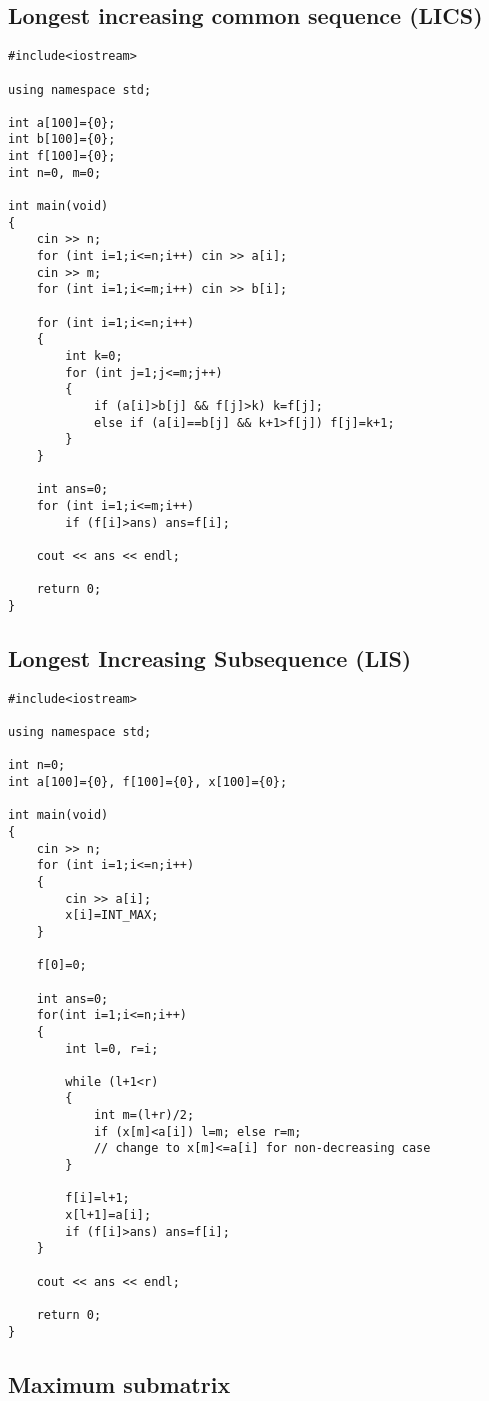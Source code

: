 \documentclass[a4paper]{article}
\begin{document}
\subsection{Longest increasing common sequence (LICS)}

\begin{verbatim}
#include<iostream>

using namespace std;

int a[100]={0};
int b[100]={0};
int f[100]={0};
int n=0, m=0;

int main(void)
{
	cin >> n;
	for (int i=1;i<=n;i++) cin >> a[i];
	cin >> m;
	for (int i=1;i<=m;i++) cin >> b[i];

	for (int i=1;i<=n;i++)
	{
		int k=0;
		for (int j=1;j<=m;j++)
		{
			if (a[i]>b[j] && f[j]>k) k=f[j];
			else if (a[i]==b[j] && k+1>f[j]) f[j]=k+1;
		}
	}

	int ans=0;
	for (int i=1;i<=m;i++)
		if (f[i]>ans) ans=f[i];

	cout << ans << endl;

	return 0;
}
\end{verbatim}

\subsection{Longest Increasing Subsequence (LIS)}

\begin{verbatim}
#include<iostream>

using namespace std;

int n=0;
int a[100]={0}, f[100]={0}, x[100]={0};

int main(void)
{
	cin >> n;
	for (int i=1;i<=n;i++)
	{
		cin >> a[i];
		x[i]=INT_MAX;
	}

	f[0]=0;

	int ans=0;
	for(int i=1;i<=n;i++)
	{
		int l=0, r=i;

		while (l+1<r)
		{
			int m=(l+r)/2;
			if (x[m]<a[i]) l=m; else r=m;
			// change to x[m]<=a[i] for non-decreasing case
		}

		f[i]=l+1;
		x[l+1]=a[i];
		if (f[i]>ans) ans=f[i];
	}

	cout << ans << endl;

	return 0;
}
\end{verbatim}

\subsection{Maximum submatrix}
\end{document}
